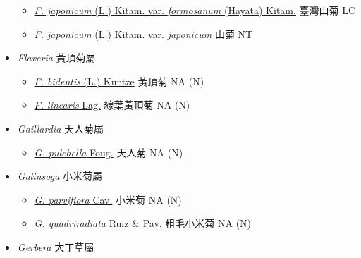 \begin{itemize}
  \begin{itemize}
        \item[] \href{http://www.theplantlist.org/tpl1.1/search?q=Farfugium+japonicum+var.+formosanum}{\textit{F. japonicum} (L.) Kitam. var. \textit{formosanum} (Hayata) Kitam.}   臺灣山菊   LC
        \item[] \href{http://www.theplantlist.org/tpl1.1/search?q=Farfugium+japonicum+var.+japonicum}{\textit{F. japonicum} (L.) Kitam. var. \textit{japonicum}}   山菊   NT
  \end{itemize}
 \item[] \textit{Flaveria} 黃頂菊屬
                                
  \begin{itemize}
        \item[] \href{http://www.theplantlist.org/tpl1.1/search?q=Flaveria+bidentis}{\textit{F. bidentis} (L.) Kuntze}   黃頂菊   NA (N)
        \item[] \href{http://www.theplantlist.org/tpl1.1/search?q=Flaveria+linearis}{\textit{F. linearis} Lag.}   線葉黃頂菊   NA (N)
  \end{itemize}
 \item[] \textit{Gaillardia} 天人菊屬
                                
  \begin{itemize}
        \item[] \href{http://www.theplantlist.org/tpl1.1/search?q=Gaillardia+pulchella}{\textit{G. pulchella} Foug.}   天人菊   NA (N)
  \end{itemize}
 \item[] \textit{Galinsoga} 小米菊屬
                                
  \begin{itemize}
        \item[] \href{http://www.theplantlist.org/tpl1.1/search?q=Galinsoga+parviflora}{\textit{G. parviflora} Cav.}   小米菊   NA (N)
        \item[] \href{http://www.theplantlist.org/tpl1.1/search?q=Galinsoga+quadriradiata}{\textit{G. quadriradiata} Ruiz \& Pav.}   粗毛小米菊   NA (N)
  \end{itemize}
 \item[] \textit{Gerbera} 大丁草屬
                                

\end{itemize}
